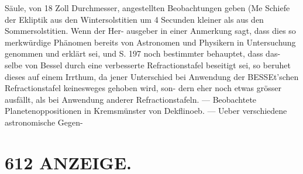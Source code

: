 \documentclass[12pt,a4paper]{article}
\begin{document}
{{{{{{{{ Säule,  von  18  Zoll  Durchmesser,  angestellten  Beobachtungen  geben  (Me  Schiefe  der Ekliptik  aus  den  Wintersolstitien  um  4  Secunden  kleiner  als  aus  den  Sommersolstitien.  Wenn  der  Her- ausgeber in  einer  Anmerkung  sagt,  dass  dies  so  merkwürdige  Phänomen  bereits  von  Astronomen  und Physikern  in  Untersuchung  genommen  und  erklärt  sei,  und  S.  197  noch  bestimmter  behauptet,  dass  das- selbe von  Bessel  durch  eine  verbesserte  Refractionstafel  beseitigt  sei,  so  beruhet  dieses  auf  einem  Irrthum, da  jener  Unterschied  bei  Anwendung  der  BESSEt'schen  Refractionstafel  keinesweges  gehoben  wird,  son- dern eher  noch  etwas  grösser  ausfällt,  als  bei  Anwendung  anderer  Refractionstafeln.  ---  Beobachtete Planetenoppositionen  in  Kremsmünster  von  Dekflinoeb.  ---     Ueber   verschiedene  astronomische   Gegen-


\section*{612  ANZEIGE.}

}}}}}}}}
\end{document}
